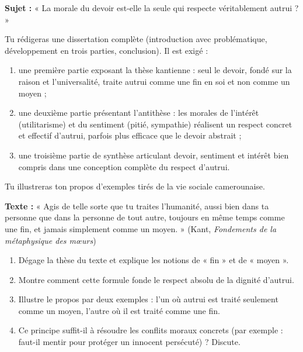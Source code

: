 \documentclass[11pt]{article}
\newcounter{popsec}
\newcounter{popsub}
\newcommand{\courssub}[1]{%
  \stepcounter{popsub}%
  \par\vspace{9pt}\noindent{\popxbold\fontsize{11.5}{13}\selectfont\color{popink}{\color{poporange}\thepopsec.\thepopsub}\hspace{6pt}#1}\par\nopagebreak\vspace{4pt}
}
\begin{document}
\courssub{Je me prépare au Bac}

\begin{exercice}
\textbf{Sujet :} « La morale du devoir est-elle la seule qui respecte véritablement autrui ? »

Tu rédigeras une dissertation complète (introduction avec problématique, développement en trois parties, conclusion). Il est exigé :
\begin{enumerate}
\item une première partie exposant la thèse kantienne : seul le devoir, fondé sur la raison et l'universalité, traite autrui comme une fin en soi et non comme un moyen ;
\item une deuxième partie présentant l'antithèse : les morales de l'intérêt (utilitarisme) et du sentiment (pitié, sympathie) réalisent un respect concret et effectif d'autrui, parfois plus efficace que le devoir abstrait ;
\item une troisième partie de synthèse articulant devoir, sentiment et intérêt bien compris dans une conception complète du respect d'autrui.
\end{enumerate}
Tu illustreras ton propos d'exemples tirés de la vie sociale camerounaise.
\end{exercice}

\begin{exercice}
\textbf{Texte :} « Agis de telle sorte que tu traites l'humanité, aussi bien dans ta personne que dans la personne de tout autre, toujours en même temps comme une fin, et jamais simplement comme un moyen. » (Kant, \emph{Fondements de la métaphysique des mœurs})

\begin{enumerate}
\item Dégage la thèse du texte et explique les notions de « fin » et de « moyen ».
\item Montre comment cette formule fonde le respect absolu de la dignité d'autrui.
\item Illustre le propos par deux exemples : l'un où autrui est traité seulement comme un moyen, l'autre où il est traité comme une fin.
\item Ce principe suffit-il à résoudre les conflits moraux concrets (par exemple : faut-il mentir pour protéger un innocent persécuté) ? Discute.
\end{enumerate}
\end{exercice}
\end{document}
